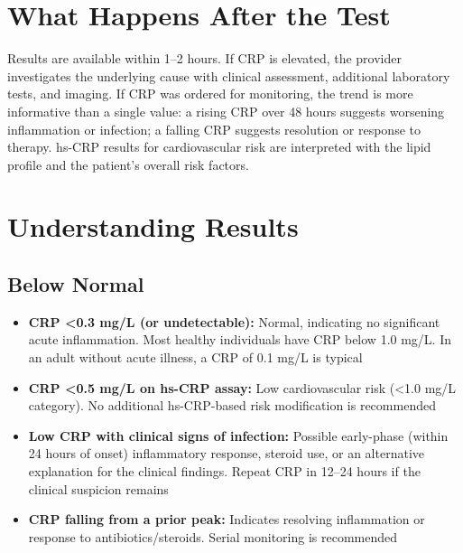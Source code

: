 \section*{What Happens After the Test}
Results are available within 1--2 hours. If CRP is elevated, the provider investigates the underlying cause with clinical assessment, additional laboratory tests, and imaging. If CRP was ordered for monitoring, the trend is more informative than a single value: a rising CRP over 48 hours suggests worsening inflammation or infection; a falling CRP suggests resolution or response to therapy. hs-CRP results for cardiovascular risk are interpreted with the lipid profile and the patient's overall risk factors.

\section*{Understanding Results}

\subsection*{Below Normal}
\begin{itemize}
  \item \textbf{CRP <0.3 mg/L (or undetectable):} Normal, indicating no significant acute inflammation. Most healthy individuals have CRP below 1.0 mg/L. In an adult without acute illness, a CRP of 0.1 mg/L is typical
  \item \textbf{CRP <0.5 mg/L on hs-CRP assay:} Low cardiovascular risk (<1.0 mg/L category). No additional hs-CRP-based risk modification is recommended
  \item \textbf{Low CRP with clinical signs of infection:} Possible early-phase (within 24 hours of onset) inflammatory response, steroid use, or an alternative explanation for the clinical findings. Repeat CRP in 12--24 hours if the clinical suspicion remains
  \item \textbf{CRP falling from a prior peak:} Indicates resolving inflammation or response to antibiotics/steroids. Serial monitoring is recommended
\end{itemize}

